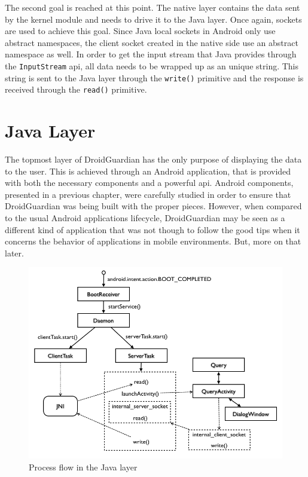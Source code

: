 The second goal is reached at this point. The native layer contains the data sent by the kernel module and needs to drive it to the Java layer. Once again, sockets are used to achieve this goal. Since Java local sockets in Android only use abstract namespaces, the client socket created in the native side use an abstract namespace as well. In order to get the input stream that Java provides through the \texttt{InputStream} \gls{api}, all data needs to be wrapped up as an unique string. This string is sent to the Java layer through the \texttt{write()} primitive and the response is received through the \texttt{read()} primitive.

\section{Java Layer}

The topmost layer of DroidGuardian has the only purpose of displaying the data to the user. This is achieved through an Android application, that is provided with both the necessary components and a powerful \gls{api}. Android components, presented in a previous chapter, were carefully studied in order to ensure that DroidGuardian was being built with the proper pieces. However, when compared to the usual Android applications lifecycle, DroidGuardian may be seen as a different kind of application that was not though to follow the good tips when it concerns the behavior of applications in mobile environments. But, more on that later.

\begin{figure}[h]
 \centering
 \includegraphics[scale=0.5]{figures/dg_java_flow.png}
 \caption{Process flow in the Java layer}
 \label{fig:dg_java_flow}
\end{figure}

